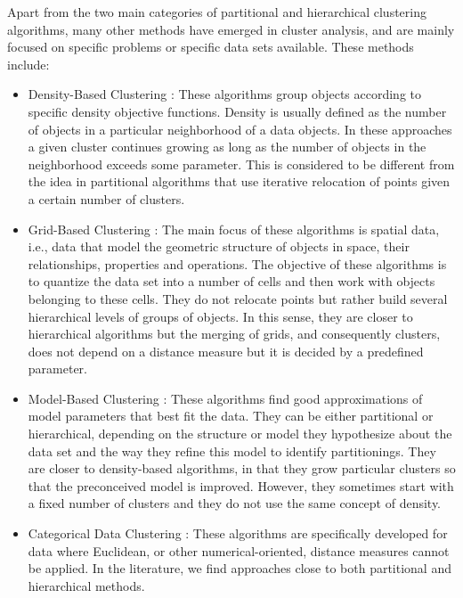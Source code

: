 Apart from the two main categories of  partitional and hierarchical clustering algorithms, many other methods
have emerged in cluster analysis, and are mainly focused on specific problems or specific data sets
available. These methods include:
\begin{itemize}
\item
Density-Based Clustering : These algorithms group objects according to specific density objective functions.
Density is usually defined as the number of objects in a particular neighborhood of a data objects.
In these approaches a given cluster continues growing as long as the number of objects in the
neighborhood exceeds some parameter. This is considered to be different from the idea in partitional
algorithms that use iterative relocation of points given a certain number of clusters.
\item
Grid-Based Clustering : The main focus of these algorithms is spatial data, i.e., data that model the geometric
structure of objects in space, their relationships, properties and operations. The objective of
these algorithms is to quantize the data set into a number of cells and then work with objects belonging
to these cells. They do not relocate points but rather build several hierarchical levels of groups of
objects. In this sense, they are closer to hierarchical algorithms but the merging of grids, and consequently
clusters, does not depend on a distance measure but it is decided by a predefined parameter.
\item
Model-Based Clustering : These algorithms find good approximations of model parameters that best fit
the data. They can be either partitional or hierarchical, depending on the structure or model they
hypothesize about the data set and the way they refine this model to identify partitionings. They
are closer to density-based algorithms, in that they grow particular clusters so that the preconceived
model is improved. However, they sometimes start with a fixed number of clusters and they do not
use the same concept of density.
\item
Categorical Data Clustering : These algorithms are specifically developed for data where Euclidean, or
other numerical-oriented, distance measures cannot be applied. In the literature, we find approaches
close to both partitional and hierarchical methods.
\end{itemize}
